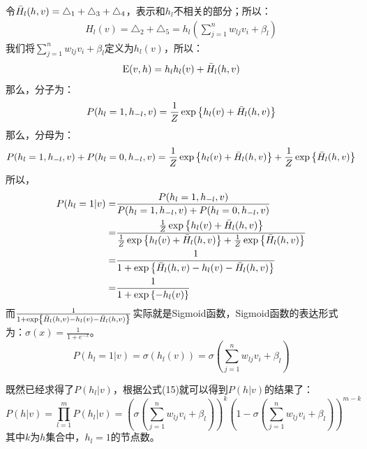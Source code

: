 \documentclass[a4paper]{article}
\begin{document}
令$\Bar{H}_l(h,v)=\triangle_1+\triangle_3+\triangle_4$，表示和$h_l$不相关的部分；所以：
\begin{equation*}
    \begin{split}
        H_l(v)=\triangle_2+\triangle_5 = h_l\left( \sum_{j=1}^n w_{lj}v_i + \beta_l \right)
    \end{split}
\end{equation*}
我们将$\sum_{j=1}^n w_{lj}v_i + \beta_l$定义为$ h_l(v)$，所以：
\begin{equation}
    \mathrm{E}(v,h) = h_lh_l(v) + \Bar{H}_l(h,v)
\end{equation}
那么，分子为：
\begin{equation}
    P(h_l=1,h_{-l},v) = \frac{1}{Z}\exp\left\{ h_l(v) + \Bar{H}_l(h,v) \right\}
\end{equation}
那么，分母为：
\begin{equation}
    P(h_l=1,h_{-l},v) + P(h_l=0,h_{-l},v) = \frac{1}{Z}\exp\left\{ h_l(v) + \Bar{H}_l(h,v) \right\} + \frac{1}{Z}\exp\left\{ \Bar{H}_l(h,v) \right\}
\end{equation}
所以，
\begin{equation}
\begin{split}
    P(h_l=1|v) = & \frac{P(h_l=1,h_{-l},v)}{P(h_l=1,h_{-l},v) + P(h_l=0,h_{-l},v)} \\
    = & \frac{\frac{1}{Z}\exp\left\{ h_l(v) + \Bar{H}_l(h,v) \right\}}{\frac{1}{Z}\exp\left\{ h_l(v) + \Bar{H}_l(h,v) \right\} + \frac{1}{Z}\exp\left\{ \Bar{H}_l(h,v) \right\}} \\
    = & \frac{1}{1+\exp\left\{ \Bar{H}_l(h,v) - h_l(v) - \Bar{H}_l(h,v) \right\}} \\
    = & \frac{1}{1+\exp\left\{ - h_l(v) \right\}}
\end{split}
\end{equation}
而$\frac{1}{1+\exp\left\{ \Bar{H}_l(h,v) - h_l(v) - \Bar{H}_l(h,v) \right\}}$实际就是Sigmoid函数，Sigmoid函数的表达形式为：$\sigma(x) = \frac{1}{1+e^{-x}}$。
\begin{equation}
    P(h_l=1|v) = \sigma( h_l(v)) = \sigma(\sum_{j=1}^n w_{lj}v_i + \beta_l)
\end{equation}

既然已经求得了$P(h_l|v)$，根据公式(15)就可以得到$P(h|v)$的结果了：
\begin{equation}
    P(h|v) = \prod_{l=1}^m P(h_l|v) = \left( \sigma\left(\sum_{j=1}^n w_{lj}v_i + \beta_l\right) \right)^k\left(1-\sigma\left(\sum_{j=1}^n w_{lj}v_i + \beta_l\right)\right)^{m-k}
\end{equation}
其中$k$为$h$集合中，$h_l=1$的节点数。
\end{document}
